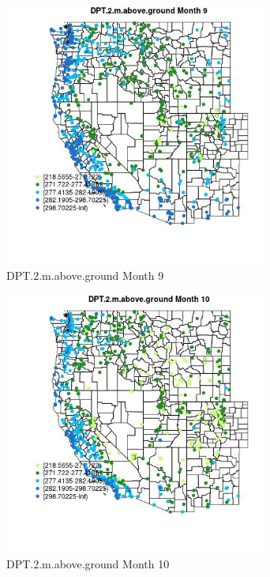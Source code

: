 \begin{figure} 
\centering  
\includegraphics[width=0.77\textwidth]{Code_Outputs/Report_ML_input_PM25_Step4_part_e_de_duplicated_aves_compiled_2019-05-21wNAs_MapObsMo9DPT2maboveground.jpg} 
\caption{\label{fig:Report_ML_input_PM25_Step4_part_e_de_duplicated_aves_compiled_2019-05-21wNAsMapObsMo9DPT2maboveground}DPT.2.m.above.ground Month 9} 
\end{figure} 
 

\begin{figure} 
\centering  
\includegraphics[width=0.77\textwidth]{Code_Outputs/Report_ML_input_PM25_Step4_part_e_de_duplicated_aves_compiled_2019-05-21wNAs_MapObsMo10DPT2maboveground.jpg} 
\caption{\label{fig:Report_ML_input_PM25_Step4_part_e_de_duplicated_aves_compiled_2019-05-21wNAsMapObsMo10DPT2maboveground}DPT.2.m.above.ground Month 10} 
\end{figure} 
 

